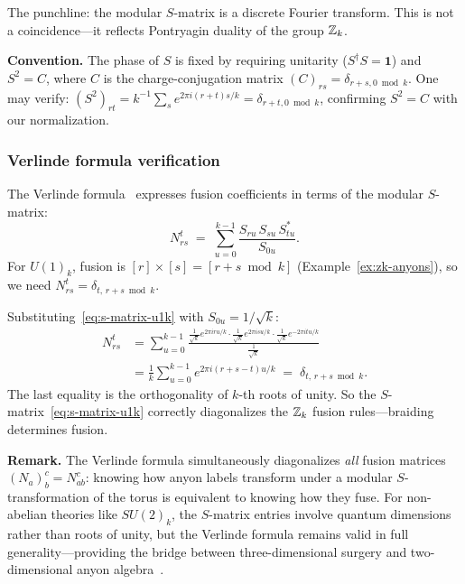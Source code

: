 \noindent
The punchline: the modular $S$-matrix is a discrete Fourier transform.  This is
not a coincidence---it reflects Pontryagin duality of the group $\mathbb{Z}_k$.

\medskip
\noindent\textbf{Convention.}
The phase of $S$ is fixed by requiring unitarity ($S^\dagger S = \mathbf{1}$)
and $S^2 = C$, where $C$ is the charge-conjugation matrix
$(C)_{rs} = \delta_{r+s,0 \bmod k}$.  One may verify:
$(S^2)_{rt} = k^{-1}\sum_s e^{2\pi i(r+t)s/k} = \delta_{r+t,0\bmod k}$,
confirming $S^2 = C$ with our normalization.

\subsubsection*{Verlinde formula verification}

The Verlinde formula~\cite{Witten1989Jones} expresses fusion coefficients in
terms of the modular $S$-matrix:
\begin{equation}
\label{eq:verlinde-formula}
    N^t_{rs} \;=\; \sum_{u=0}^{k-1}
    \frac{S_{ru}\, S_{su}\, S^*_{tu}}{S_{0u}}.
\end{equation}
For $U(1)_k$, fusion is $[r] \times [s] = [r + s \bmod k]$
(Example~\ref{ex:zk-anyons}), so we need $N^t_{rs} = \delta_{t,\, r+s \bmod k}$.

Substituting~\eqref{eq:s-matrix-u1k} with $S_{0u} = 1/\sqrt{k}$:
\begin{align}
\label{eq:verlinde-check}
    N^t_{rs} &= \sum_{u=0}^{k-1}
    \frac{\frac{1}{\sqrt{k}} e^{2\pi i ru/k} \cdot
          \frac{1}{\sqrt{k}} e^{2\pi i su/k} \cdot
          \frac{1}{\sqrt{k}} e^{-2\pi i tu/k}}
         {\frac{1}{\sqrt{k}}} \nonumber\\
    &= \frac{1}{k} \sum_{u=0}^{k-1} e^{2\pi i(r+s-t)u/k}
    \;=\; \delta_{t,\, r+s \bmod k}.
\end{align}
The last equality is the orthogonality of $k$-th roots of unity.  So the
$S$-matrix~\eqref{eq:s-matrix-u1k} correctly diagonalizes the $\mathbb{Z}_k$ fusion
rules---braiding determines fusion.

\medskip
\noindent\textbf{Remark.}
The Verlinde formula simultaneously diagonalizes \emph{all} fusion matrices
$(N_a)^c_b = N^c_{ab}$: knowing how anyon labels transform under a modular
$S$-transformation of the torus is equivalent to knowing how they fuse.
For non-abelian theories like $SU(2)_k$, the $S$-matrix entries involve
quantum dimensions rather than roots of unity, but the Verlinde formula
remains valid in full generality---providing the bridge between
three-dimensional surgery and two-dimensional anyon
algebra~\cite{Witten1989Jones}.

